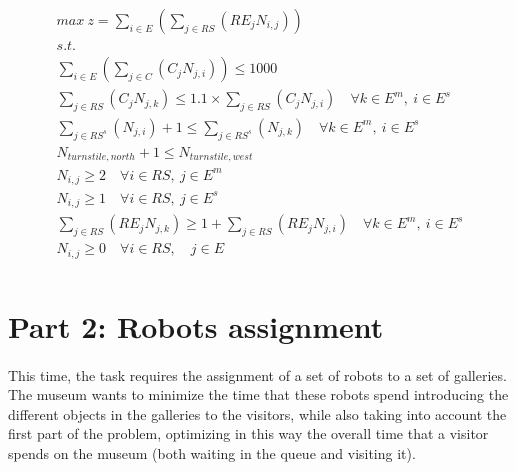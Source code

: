 \begin{gather}
    max\ z = \sum_{i \in E}\left({\sum_{j \in RS}\left({RE_j N_{i,j}}\right)}\right)  \nonumber\\
    s.t. \nonumber\\
    \sum_{i \in E}\left({\sum_{j \in C}\left({C_j N_{j,i}}\right)}\right) \leq 1000 \nonumber\\
    \sum_{j \in RS}\left({C_j N_{j,k}}\right) \leq 1.1 \times \sum_{j \in RS}\left({C_j N_{j,i}}\right) \quad \forall k \in E^m,\ i \in E^s \nonumber\\
    \sum_{j \in RS^s} {\left (N_{j,i}\right)} + 1 \leq \sum_{j \in RS^s} {\left (N_{j,k}\right)} \quad \forall k \in E^m,\ i \in E^s \nonumber\\
    N_{turnstile,north} + 1 \leq N_{turnstile,west} \nonumber\\
    N_{i,j} \geq 2 \quad \forall i \in RS,\ j \in E^m \nonumber\\
    N_{i,j} \geq 1 \quad \forall i \in RS,\ j \in E^s \nonumber\\
    \sum_{j \in RS}\left({RE_j N_{j,k}}\right) \geq 1 + \sum_{j \in RS}\left({RE_j N_{j,i}}\right) \quad \forall k \in E^m,\ i \in E^s \nonumber\\
    N_{i,j} \geq 0 \quad \forall i \in RS, \quad j \in E \nonumber\\
\end{gather}




















\section{Part 2: Robots assignment}

\paragraph{}
This time, the task requires the assignment of a set of robots to a set of galleries. The museum wants to minimize the time that these robots spend introducing the different objects in the galleries to the visitors, while also taking into account the first part of the problem, optimizing in this way the overall time that a visitor spends on the museum (both waiting in the queue and visiting it).

